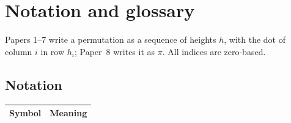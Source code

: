 \chapter*{Notation and glossary}

Papers 1--7 write a permutation as a sequence of heights $h$, with the dot of column $i$ in row
$h_i$; Paper~8 writes it as $\pi$. All indices are zero-based.

\section*{Notation}
\begin{longtable}{@{}l >{\raggedright\arraybackslash}p{}@{}}
\toprule
Symbol & Meaning \\
\midrule
\endhead


\end{longtable}
